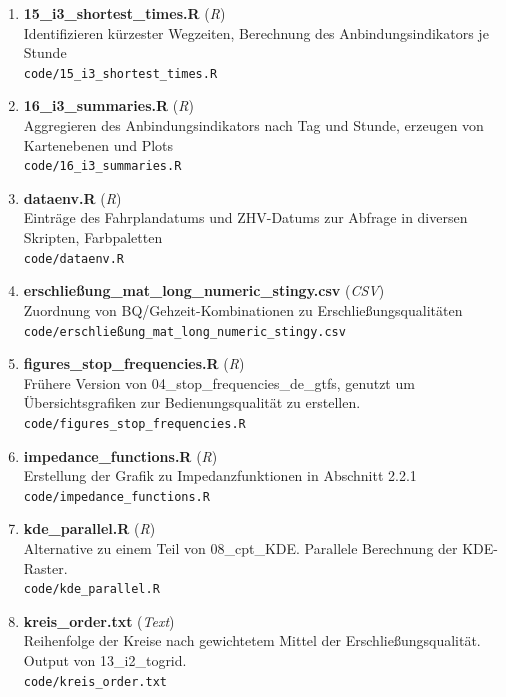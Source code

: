 \begin{enumerate}[label=\arabic*, leftmargin=*, itemsep=0.5em, topsep=0.3em]
\begin{enumerate}[label=\arabic{enumi}.\arabic*, leftmargin=*, itemsep=0.5em, topsep=0.3em]
\texttt{\small code/14\_i3\_traveltimes.R}
\item \textbf{15\_i3\_shortest\_times.R} \textnormal{(\textit{R})}\\
Identifizieren kürzester Wegzeiten, Berechnung des Anbindungsindikators je Stunde\\
\texttt{\small code/15\_i3\_shortest\_times.R}
\item \textbf{16\_i3\_summaries.R} \textnormal{(\textit{R})}\\
Aggregieren des Anbindungsindikators nach Tag und Stunde, erzeugen von Kartenebenen und Plots\\
\texttt{\small code/16\_i3\_summaries.R}
\item \textbf{dataenv.R} \textnormal{(\textit{R})}\\
Einträge des Fahrplandatums und ZHV-Datums zur Abfrage in diversen Skripten, Farbpaletten\\
\texttt{\small code/dataenv.R}
\item \textbf{erschließung\_mat\_long\_numeric\_stingy.csv} \textnormal{(\textit{CSV})}\\
Zuordnung von BQ/Gehzeit-Kombinationen zu Erschließungsqualitäten\\
\texttt{\small code/erschließung\_mat\_long\_numeric\_stingy.csv}
\item \textbf{figures\_stop\_frequencies.R} \textnormal{(\textit{R})}\\
Frühere Version von 04\_stop\_frequencies\_de\_gtfs, genutzt um Übersichtsgrafiken zur Bedienungsqualität zu erstellen.\\
\texttt{\small code/figures\_stop\_frequencies.R}
\item \textbf{impedance\_functions.R} \textnormal{(\textit{R})}\\
Erstellung der Grafik zu Impedanzfunktionen in Abschnitt 2.2.1\\
\texttt{\small code/impedance\_functions.R}
\item \textbf{kde\_parallel.R} \textnormal{(\textit{R})}\\
Alternative zu einem Teil von 08\_cpt\_KDE. Parallele Berechnung der KDE-Raster.\\
\texttt{\small code/kde\_parallel.R}
\item \textbf{kreis\_order.txt} \textnormal{(\textit{Text})}\\
Reihenfolge der Kreise nach gewichtetem Mittel der Erschließungsqualität. Output von 13\_i2\_togrid.\\
\texttt{\small code/kreis\_order.txt}

\end{enumerate}
\end{enumerate}
